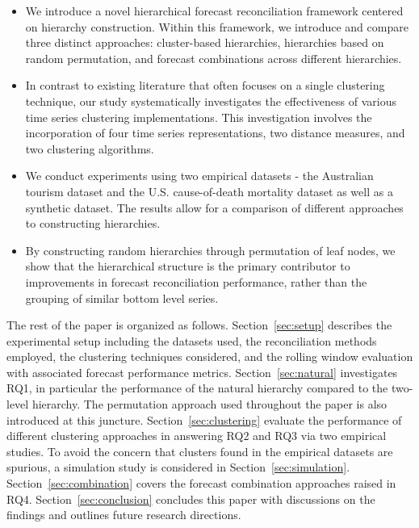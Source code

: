 \documentclass[a4paper,review,12pt,authoryear]{elsarticle}
\begin{document}
\begin{itemize}
  \item We introduce a novel hierarchical forecast reconciliation framework centered on hierarchy construction.  Within this framework, we introduce and compare three distinct approaches: cluster-based hierarchies, hierarchies based on random permutation, and  forecast combinations across different hierarchies.
  \item In contrast to existing literature that often focuses on a single clustering technique, our study systematically investigates the effectiveness of various time series clustering implementations. This investigation involves the incorporation of four time series representations, two distance measures, and two clustering algorithms.
  \item We conduct experiments using two empirical datasets - the Australian tourism dataset and the U.S. cause-of-death mortality dataset as well as a synthetic dataset. The results allow for a comparison of different approaches to constructing hierarchies.
  \item By constructing random hierarchies through permutation of leaf nodes, we show that the hierarchical structure is the primary contributor to improvements in forecast reconciliation performance, rather than the grouping of similar bottom level series. 

\end{itemize}

The rest of the paper is organized as follows. Section~\ref{sec:setup} describes the experimental setup including the datasets used, the reconciliation methods employed, the clustering techniques considered, and the rolling window evaluation with associated forecast performance metrics. Section~\ref{sec:natural} investigates RQ1, in particular the performance of the natural hierarchy compared to the two-level hierarchy. The permutation approach used throughout the paper is also introduced at this juncture. Section~\ref{sec:clustering} evaluate the performance of different clustering approaches in answering RQ2 and RQ3 via two empirical studies. To avoid the concern that clusters found in the empirical datasets are spurious, a simulation study is considered in Section~\ref{sec:simulation}. Section~\ref{sec:combination} covers the forecast combination approaches raised in RQ4. Section~\ref{sec:conclusion} concludes this paper with discussions on the findings and outlines future research directions.

\end{document}
